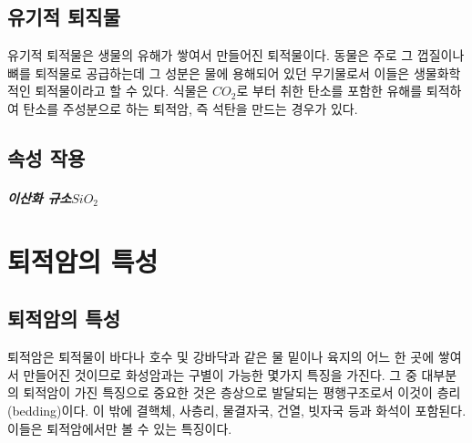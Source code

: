 \documentclass[12pt, a4paper, twoside]{book}
\begin{document}
	\section{유기적 퇴직물}

		유기적 퇴적물은 생물의 유해가 쌓여서 만들어진 퇴적물이다.
		동물은 주로 그 껍질이나 뼈를 퇴적물로 공급하는데 그 성분은 물에 용해되어 있던 무기물로서 이들은 생물화학적인 퇴적물이라고 할 수 있다.
		식물은 $CO_2$로 부터 취한 탄소를 포함한 유해를 퇴적하여 탄소를 주성분으로 하는 퇴적암, 즉 석탄을 만드는 경우가 있다.







	\clearpage
	\section{속성 작용}






		\paragraph{이산화 규소$SiO_2$}





	\clearpage
	\chapter{퇴적암의 특성}
	\minitoc				%



	\clearpage
	\section{퇴적암의 특성}


		퇴적암은 퇴적물이 바다나 호수 및 강바닥과 같은 물 밑이나 육지의 어느 한 곳에 쌓여서 만들어진 것이므로 화성암과는 구별이 가능한 몇가지 특징을 가진다.
		그 중 대부분의 퇴적암이 가진 특징으로 중요한 것은 층상으로 발달되는 평행구조로서 이것이 층리(bedding)이다. 
		이 밖에 결핵체, 사층리, 물결자국, 건열, 빗자국 등과 화석이 포함된다.
		이들은 퇴적암에서만 볼 수 있는 특징이다.
\end{document}
